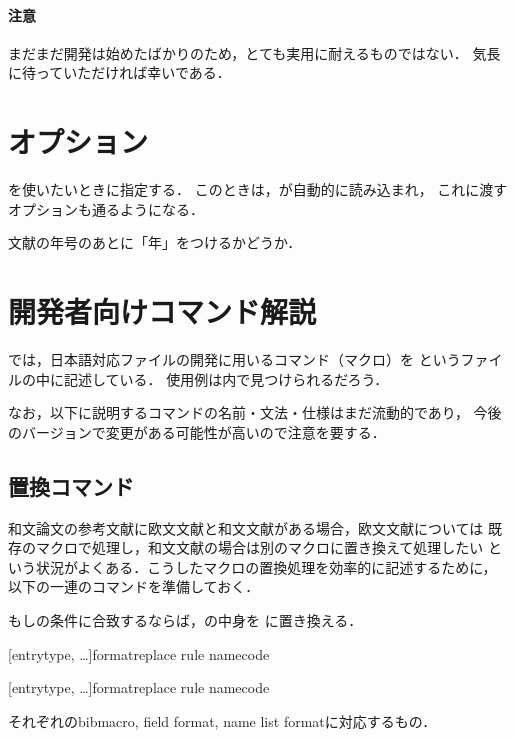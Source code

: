 \documentclass[lualatex,ja=standard,magstyle=real]{bxjsarticle}
\begin{document}
\paragraph{注意}
まだまだ開発は始めたばかりのため，とても実用に耐えるものではない．
気長に待っていただければ幸いである．

\section{オプション}

\begin{optionlist}
  を使いたいときに指定する．
  このときは，が自動的に読み込まれ，
  これに渡すオプションも通るようになる．

  文献の年号のあとに「年」をつけるかどうか．
\end{optionlist}

\section{開発者向けコマンド解説}
では，日本語対応ファイルの開発に用いるコマンド（マクロ）を
というファイルの中に記述している．
使用例は内で見つけられるだろう．

なお，以下に説明するコマンドの名前・文法・仕様はまだ流動的であり，
今後のバージョンで変更がある可能性が高いので注意を要する．

\subsection{置換コマンド}

和文論文の参考文献に欧文文献と和文文献がある場合，欧文文献については
既存のマクロで処理し，和文文献の場合は別のマクロに置き換えて処理したい
という状況がよくある．こうしたマクロの置換処理を効率的に記述するために，
以下の一連のコマンドを準備しておく．

\begin{ltxsyntax}

  もしの条件に合致するならば，の中身を
  に置き換える．


  [entrytype, \dots]{format}{replace rule name}{code}

  [entrytype, \dots]{format}{replace rule name}{code}

  それぞれのbibmacro, field format, name list formatに対応するもの．
\end{ltxsyntax}
\end{document}
